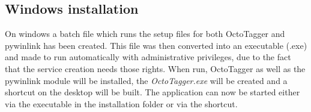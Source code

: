 \subsection{Windows installation}
\label{sub:mod:wininstall}
\def\kapitelautor{Christoph Führer}

On windows a batch file which runs the setup files for both OctoTagger and pywinlink has been created. This file was then converted into an executable (.exe) and made to run automatically with administrative privileges, due to the fact that the service creation needs those rights. When run, OctoTagger as well as the pywinlink module will be installed, the \emph{OctoTagger.exe} will be created and a shortcut on the desktop will be built. The application can now be started either via the executable in the installation folder or via the shortcut. 